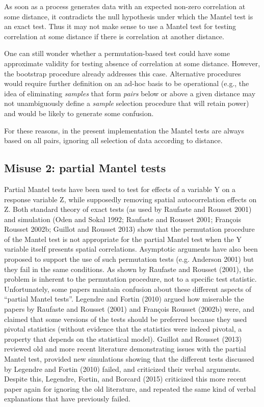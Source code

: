 \documentclass[12pt,]{book}
\theoremstyle{definition}
\theoremstyle{definition}
\theoremstyle{definition}
\theoremstyle{remark}
\begin{document}
As soon as a process generates data with an expected non-zero
correlation at some distance, it contradicts the null hypothesis under
which the Mantel test is an exact test. Thus it may not make sense to
use a Mantel test for testing correlation at some distance if there is
correlation at another distance.

One can still wonder whether a permutation-based test could have some
approximate validity for testing absence of correlation at some
distance. However, the bootstrap procedure already addresses this case.
Alternative procedures would require further definition on an ad-hoc
basis to be operational (e.g., the idea of eliminating \emph{samples}
that form \emph{pairs} below or above a given distance may not
unambiguously define a \emph{sample} selection procedure that will
retain power) and would be likely to generate some confusion.

For these reasons, in the present implementation the Mantel tests are
always based on all pairs, ignoring all selection of data according to
distance.

\subsection{Misuse 2: partial Mantel
tests}\label{misuse-2-partial-mantel-tests}

Partial Mantel tests have been used to test
for effects of a variable Y on a response variable Z, while supposedly
removing spatial autocorrelation effects on Z. Both standard theory of
exact tests (as used by Raufaste and Rousset 2001) and simulation (Oden
and Sokal 1992; Raufaste and Rousset 2001; François Rousset 2002b;
Guillot and Rousset 2013) show that the permutation procedure of the
Mantel test is not appropriate for the partial Mantel test when the Y
variable itself presents spatial correlations. Asymptotic arguments have
also been proposed to support the use of such permutation tests (e.g.
Anderson 2001) but they fail in the same conditions. As shown by
Raufaste and Rousset (2001), the problem is inherent to the permutation
procedure, not to a specific test statistic. Unfortunately, some papers
maintain confusion about these different aspects of ``partial Mantel
tests''. Legendre and Fortin (2010) argued how miserable the papers by
Raufaste and Rousset (2001) and François Rousset (2002b) were, and
claimed that some versions of the tests should be preferred because they
used pivotal statistics (without evidence that the statistics were
indeed pivotal, a property that depends on the statistical model).
Guillot and Rousset (2013) reviewed old and more recent literature
demonstrating issues with the partial Mantel test, provided new
simulations showing that the different tests discussed by Legendre and
Fortin (2010) failed, and criticized their verbal arguments. Despite
this, Legendre, Fortin, and Borcard (2015) criticized this more recent
paper again for ignoring the old literature, and repeated the same kind
of verbal explanations that have previously failed.
\end{document}
